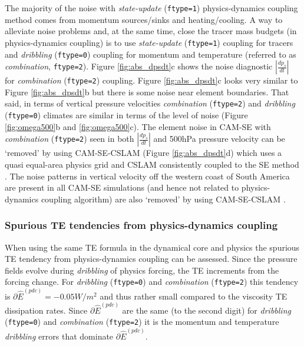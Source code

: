 \documentclass{agujournal}
\newcommand*{\gi}[1]{\widehat{#1}}
\begin{document}
The majority of the noise with {\em{state-update}} ({\tt{ftype=1}}) physics-dynamics coupling method comes from momentum sources/sinks and heating/cooling. A way to alleviate noise problems and, at the same time, close the tracer mass budgets (in physics-dynamics coupling) is to use {\em{state-update}} ({\tt{ftype=1}}) coupling for tracers and {\em{dribbling}} ({\tt{ftype=0}}) coupling for momentum and temperature (referred to as {\em{combination}}, {\tt{ftype=2}}). Figure \ref{fig:abs_dpsdt}c shows the noise diagnostic $|\frac{dp_s}{dt}|$ for {\em{combination}} ({\tt{ftype=2}}) coupling. Figure \ref{fig:abs_dpsdt}c looks very similar to Figure \ref{fig:abs_dpsdt}b but there is some noise near element boundaries. That said, in terms of vertical pressure velocities {\em{combination}} ({\tt{ftype=2}}) and {\em{dribbling}} ({\tt{ftype=0}}) climates are similar in terms of the level of noise (Figure \ref{fig:omega500}b and \ref{fig:omega500}c). The element noise in CAM-SE with {\em{combination}} ({\tt{ftype=2}}) seen in both $|\frac{dp_s}{dt}|$ and 500hPa pressure velocity can be `removed' by using CAM-SE-CSLAM (Figure \ref{fig:abs_dpsdt}d) which uses a quasi equal-area physics grid and CSLAM \cite[Conservative Semi-LAgrangian Multi-tracer; ][]{LNU2010JCP} consistently coupled to the SE method \citep{LTOUNGK2017MWR}. The noise patterns in vertical velocity off the western coast of South America are present in all CAM-SE simulations (and hence not related to physics-dynamics coupling algorithm) are also `removed' by using CAM-SE-CSLAM \citep{HetAl2018MWR}.
\subsubsection{Spurious TE tendencies from physics-dynamics coupling}
When using the same TE formula in the dynamical core and physics the spurious TE tendency from physics-dynamics coupling can be assessed. Since the pressure fields evolve during {\em{dribbling}} of physics forcing, the TE increments from the forcing change. For {\em{dribbling}} ({\tt{ftype=0}}) and {\em{combination}} ({\tt{ftype=2}}) this tendency is $\partial \gi{E}^{({pdc})}=-0.05 W/m^2$ and thus rather small compared to the viscosity TE dissipation rates. Since $\partial \gi{E}^{({pdc})}$ are the same (to the second digit) for  {\em{dribbling}} ({\tt{ftype=0}}) and  {\em{combination}} ({\tt{ftype=2}}) it is the momentum and temperature {\em{dribbling}} errors that dominate $\partial \gi{E}^{({pdc})}$.

\end{document}
